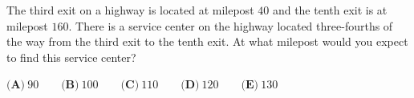 The third exit on a highway is located at milepost $40$ and the tenth exit is at milepost $160$. There is a service center on the highway located three-fourths of the way from the third exit to the tenth exit. At what milepost would you expect to find this service center?

$\textbf{(A)}\ 90\qquad\textbf{(B)}\ 100\qquad\textbf{(C)}\ 110\qquad\textbf{(D)}\ 120\qquad\textbf{(E)}\ 130$
